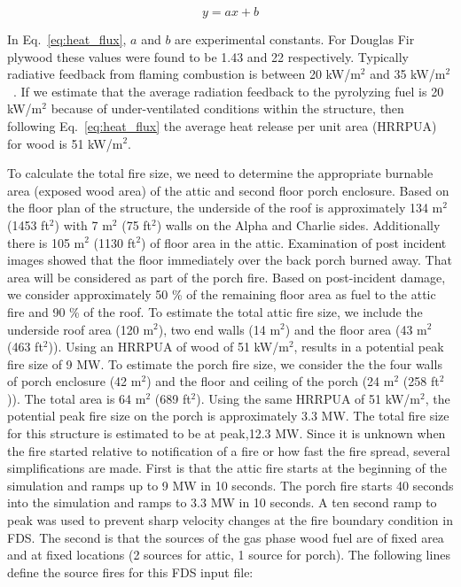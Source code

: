 \documentclass[11pt,oneside]{book}
\begin{document}
\begin{equation}
y = ax+b
\label{eq:heat_flux}
\end{equation}

In Eq.~\ref{eq:heat_flux}, $a$ and $b$ are experimental constants. For Douglas Fir plywood these values were found to be 1.43 and 22 respectively. Typically radiative feedback from flaming combustion is between 20 kW/m$^2$ and 35 kW/m$^2$~\cite{tsaidrysdale}. If we estimate that the average radiation feedback to the pyrolyzing fuel is 20 kW/m$^2$ because of under-ventilated conditions within the structure, then following Eq.~\ref{eq:heat_flux} the average heat release per unit area (HRRPUA) for wood is 51 kW/m$^2$.

To calculate the total fire size, we need to determine the appropriate burnable area (exposed wood area) of the attic and second floor porch enclosure. Based on the floor plan of the structure, the underside of the roof is approximately 134 m$^2$ (1453 ft$^2$) with 7 m$^2$ (75 ft$^2$) walls on the Alpha and Charlie sides. Additionally there is 105 m$^2$ (1130 ft$^2$) of floor area in the attic. Examination of post incident images showed that the floor immediately over the back porch burned away. That area will be considered as part of the porch fire. Based on post-incident damage, we consider approximately 50 \% of the remaining floor area as fuel to the attic fire and 90 \% of the roof. To estimate the total attic fire size, we include the underside roof area (120 m$^2$), two end walls (14 m$^2$) and the floor area (43 m$^2$ (463 ft$^2$)). Using an HRRPUA of wood of 51 kW/m$^2$, results in a potential peak fire size of 9 MW. To estimate the porch fire size, we consider the the four walls of porch enclosure (42 m$^2$) and the floor and ceiling of the porch (24 m$^2$ (258 ft$^2$)). The total area is 64 m$^2$ (689 ft$^2$). Using the same HRRPUA of 51 kW/m$^2$, the potential peak fire size on the porch is approximately 3.3 MW. The total fire size for this structure is estimated to be at peak,12.3 MW. Since it is unknown when the fire started relative to notification of a fire or how fast the fire spread, several simplifications are made. First is that the attic fire starts at the beginning of the simulation and ramps up to 9 MW in 10 seconds. The porch fire starts 40 seconds into the simulation and ramps to 3.3 MW in 10 seconds. A ten second ramp to peak was used to prevent sharp velocity changes at the fire boundary condition in FDS. The second is that the sources of the gas phase wood fuel are of fixed area and at fixed locations (2 sources for attic, 1 source for porch). The following lines define the source fires for this FDS input file:
\end{document}
